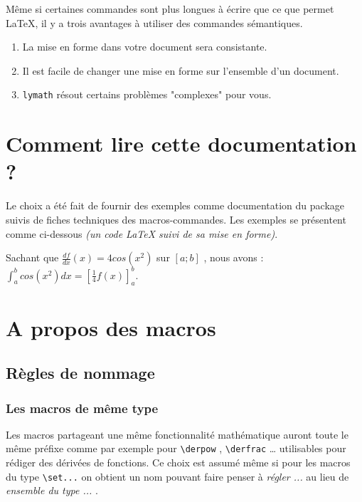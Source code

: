 \documentclass[12pt,a4paper]{article}
\theoremstyle{definition}
\begin{document}
Même si certaines commandes sont plus longues à écrire que ce que permet \LaTeX{}, il y a trois avantages à utiliser des commandes sémantiques.
\begin{enumerate}
	\item La mise en forme dans votre document sera consistante.

	\item Il est facile de changer une mise en forme sur l'ensemble d'un document.

	\item \verb+lymath+ résout certains problèmes "complexes" pour vous.
\end{enumerate}



\section{Comment lire cette documentation ?}

Le choix a été fait de fournir des exemples comme documentation du package suivis de fiches techniques des macros-commandes. Les exemples se présentent comme ci-dessous \textit{(un code \LaTeX{} suivi de sa mise en forme)}.

\begin{tcblisting}{}
Sachant que $\displaystyle \frac{df}{dx}(x) = 4 cos(x^2)$ sur $[a ; b]$ , nous avons :
$\displaystyle \int_a^b cos(x^2) dx = \left[ \frac{1}{4} f(x) \right]_a^b$.
\end{tcblisting}



\section{A propos des macros}

\subsection{Règles de nommage}

\subsubsection{Les macros de même \og type \fg}

Les macros partageant une même fonctionnalité mathématique auront toute le même préfixe comme par exemple pour \verb+\derpow+ , \verb+\derfrac+ \dots{} utilisables pour rédiger des dérivées de fonctions.
Ce choix est assumé même si pour les macros du type \verb+\set...+ on obtient un nom pouvant faire penser à \emph{\og régler ... \fg} au lieu de \emph{\og ensemble du type ... \fg}.
\end{document}

